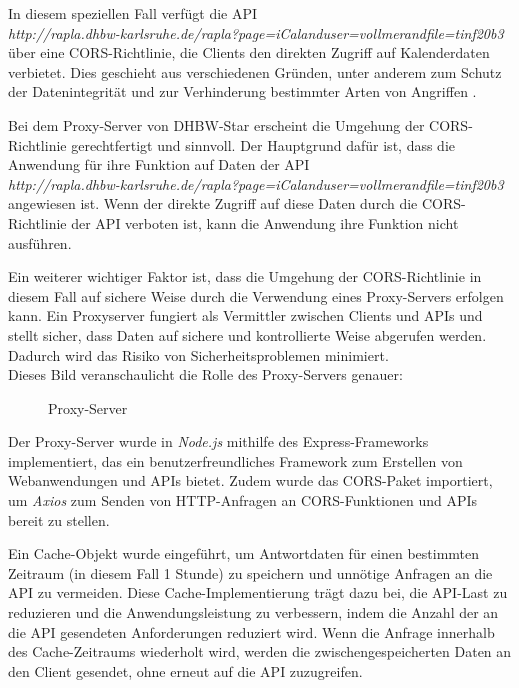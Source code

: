 In diesem speziellen Fall verfügt die API\\ \emph{http://rapla.dhbw-karlsruhe.de/rapla?page=iCalanduser=vollmerandfile=tinf20b3} über eine CORS-Richtlinie, die Clients den direkten Zugriff auf Kalenderdaten verbietet. Dies geschieht aus verschiedenen Gründen, unter anderem zum Schutz der Datenintegrität und zur Verhinderung bestimmter Arten von Angriffen \cite{crashtestsecuritycom}.

Bei dem Proxy-Server von DHBW-Star erscheint die Umgehung der CORS-Richtlinie gerechtfertigt und sinnvoll. Der Hauptgrund dafür ist, dass die Anwendung für ihre Funktion auf Daten der API\\ \emph{http://rapla.dhbw-karlsruhe.de/rapla?page=iCalanduser=vollmerandfile=tinf20b3} angewiesen ist. Wenn der direkte Zugriff auf diese Daten durch die CORS-Richtlinie der API verboten ist, kann die Anwendung ihre Funktion nicht ausführen.

Ein weiterer wichtiger Faktor ist, dass die Umgehung der CORS-Richtlinie in diesem Fall auf sichere Weise durch die Verwendung eines Proxy-Servers erfolgen kann. Ein Proxyserver fungiert als Vermittler zwischen Clients und APIs und stellt sicher, dass Daten auf sichere und kontrollierte Weise abgerufen werden. Dadurch wird das Risiko von Sicherheitsproblemen minimiert.\\
Dieses Bild veranschaulicht die Rolle des Proxy-Servers genauer:

\begin{figure}[htbp]
	\centering
	\caption{Proxy-Server}
\end{figure}

Der Proxy-Server wurde in \emph{Node.js} mithilfe des Express-Frameworks implementiert, das ein benutzerfreundliches Framework zum Erstellen von Webanwendungen und APIs bietet. Zudem wurde das CORS-Paket importiert, um \emph{Axios} zum Senden von HTTP-Anfragen an CORS-Funktionen und APIs bereit zu stellen.

Ein Cache-Objekt wurde eingeführt, um Antwortdaten für einen bestimmten Zeitraum (in diesem Fall 1 Stunde) zu speichern und unnötige Anfragen an die API zu vermeiden. Diese Cache-Implementierung trägt dazu bei, die API-Last zu reduzieren und die Anwendungsleistung zu verbessern, indem die Anzahl der an die API gesendeten Anforderungen reduziert wird. Wenn die Anfrage innerhalb des Cache-Zeitraums wiederholt wird, werden die zwischengespeicherten Daten an den Client gesendet, ohne erneut auf die API zuzugreifen.

